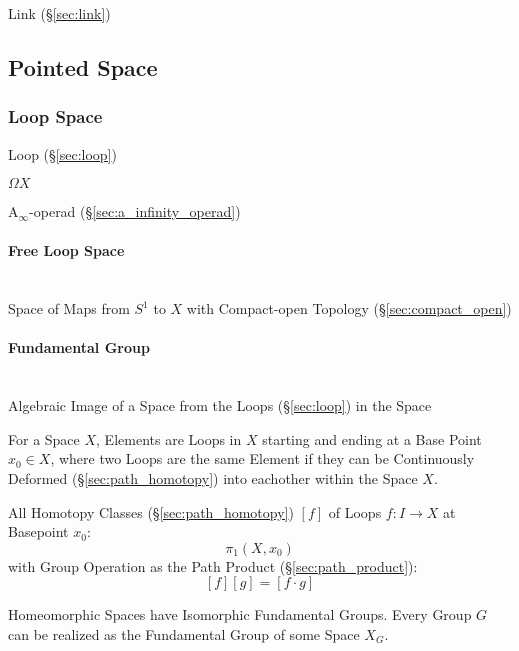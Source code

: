 Link (\S\ref{sec:link})



\subsection{Pointed Space}\label{sec:pointed_space}

\subsubsection{Loop Space}\label{sec:loop_space}

Loop (\S\ref{sec:loop})

$\Omega X$

A$_\infty$-operad (\S\ref{sec:a_infinity_operad})



\paragraph{Free Loop Space}\label{sec:free_loop_space}
\hfill \\

Space of Maps from $S^1$ to $X$ with Compact-open Topology
(\S\ref{sec:compact_open})



\paragraph{Fundamental Group}\label{sec:fundamental_group}
\hfill \\

Algebraic Image of a Space from the Loops (\S\ref{sec:loop}) in the
Space

For a Space $X$, Elements are Loops in $X$ starting and ending at a
Base Point $x_0 \in X$, where two Loops are the same Element if they
can be Continuously Deformed (\S\ref{sec:path_homotopy}) into
eachother within the Space $X$.

All Homotopy Classes (\S\ref{sec:path_homotopy}) $[f]$ of Loops $f : I
\rightarrow X$ at Basepoint $x_0$:
\[
  \pi_1(X,x_0)
\]
with Group Operation as the Path Product (\S\ref{sec:path_product}):
\[
  [f][g] = [f \cdot g]
\]

Homeomorphic Spaces have Isomorphic Fundamental Groups. Every Group
$G$ can be realized as the Fundamental Group of some Space $X_G$.
\cite{hatcher02}

